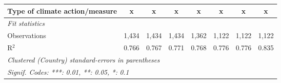 \begin{tabular}{lccccccc}
   Type of climate action/measure                                                            & x       & x       & x            & x             & x             & x             & x\\  
   \midrule \emph{Fit statistics}\\
   Observations                                                                              & 1,434   & 1,434   & 1,434        & 1,362         & 1,122         & 1,122         & 1,122\\  
   R$^2$                                                                                     & 0.766   & 0.767   & 0.771        & 0.768         & 0.776         & 0.776         & 0.835\\  
   \midrule
   \multicolumn{8}{l}{\emph{Clustered (Country) standard-errors in parentheses}}\\
   \multicolumn{8}{l}{\emph{Signif. Codes: ***: 0.01, **: 0.05, *: 0.1}}\\
\end{tabular}
\par\endgroup


